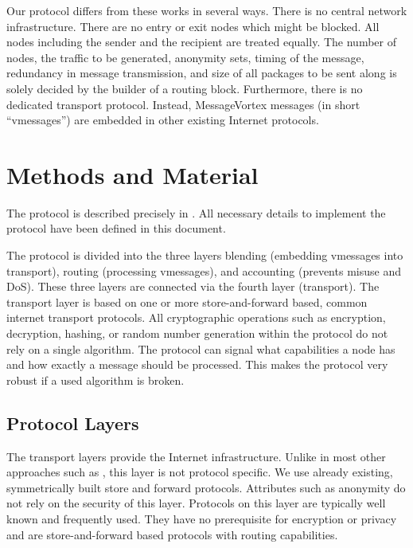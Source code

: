 \documentclass[runningheads]{llncs}
\begin{document}
Our protocol differs from these works in several ways. There is no central network infrastructure. There are no entry or exit nodes which might be blocked. All nodes including the sender and the recipient are treated equally. The number of nodes, the traffic to be generated, anonymity sets, timing of the message, redundancy in message transmission, and size of all packages to be sent along is solely decided by the builder of a routing block. Furthermore, there is no dedicated transport protocol. Instead, MessageVortex messages  (in short ``vmessages'') are embedded in other existing Internet protocols. 


\section{Methods and Material}

The protocol is described precisely in \cite{MessageVortexRFC}. All necessary details to implement the protocol have been defined in this document. 

The protocol is divided into the three layers blending (embedding vmessages into transport), routing (processing vmessages), and accounting (prevents misuse and DoS). These three layers are connected via the fourth layer (transport). The transport layer is based on one or more store-and-forward based, common internet transport protocols. All cryptographic operations such as encryption, decryption, hashing, or random number generation within the protocol do not rely on a single algorithm. The protocol can signal what capabilities a node has and how exactly a message should be processed. This makes the protocol very robust if a used algorithm is broken. 

\subsection{Protocol Layers}
The transport layers provide the Internet infrastructure. Unlike in most other approaches such as \cite{tor-design,sherwood2005p5,freenet}, this layer is not protocol specific. We use already existing, symmetrically built store and forward protocols. Attributes such as anonymity do not rely on the security of this layer. Protocols on this layer are typically well known and frequently used. They have no prerequisite for encryption or privacy and are store-and-forward based protocols with routing capabilities. 
\end{document}
